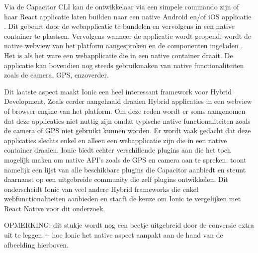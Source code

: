 
Via de Capacitor CLI kan de ontwikkelaar via een simpele commando zijn of haar React applicatie laten builden naar een native Android en/of iOS applicatie \autocite{Bron21}. Dit gebeurt door de webapplicatie te bundelen en vervolgens in een native container te plaatsen. Vervolgens wanneer de applicatie wordt geopend, wordt de native webview van het platform aangesproken en de componenten ingeladen \autocite{Bron19}. Het is als het ware een webapplicatie die in een native container draait. De applicatie kan bovendien nog steeds gebruikmaken van native functionaliteiten zoals de camera, GPS, enzoverder.

Dit laatste aspect maakt Ionic een heel interessant framework voor Hybrid Development. Zoals eerder aangehaald draaien Hybrid applicaties in een webview of browser-engine van het platform. Om deze reden wordt er soms aangenomen dat deze applicaties niet nuttig zijn omdat typische native functionaliteiten zoals de camera of GPS niet gebruikt kunnen worden. Er wordt vaak gedacht dat deze applicaties slechts enkel en alleen een webapplicatie zijn die in een native container draaien. Ionic biedt echter verschillende plugins aan die het toch mogelijk maken om native API's zoals de GPS en camera aan te spreken. \textcite{Bron22} toont namelijk een lijst van alle beschikbare plugins die Capacitor aanbiedt en steunt daarnaast op een uitgebreide community die zelf plugins ontwikkelen. Dit onderscheidt Ionic van veel andere Hybrid frameworks die enkel webfunctionaliteiten aanbieden en staaft de keuze om Ionic te vergelijken met React Native voor dit onderzoek.


OPMERKING: dit stukje wordt nog een beetje uitgebreid door de conversie extra uit te leggen + hoe Ionic het native aspect aanpakt aan de hand van de afbeelding hierboven.





